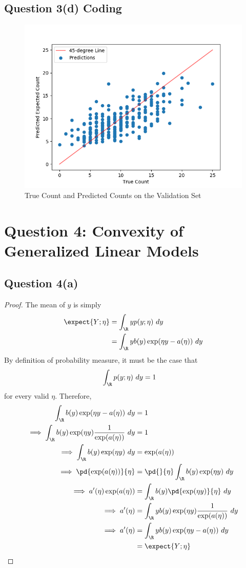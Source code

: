 \documentclass[11pt]{article}
\begin{document}
	\subsection{Question 3(d) Coding}
	\begin{figure}[h]
		\centering
		\includegraphics[width=0.6\linewidth]{src/poisson/poisson_pred.png}
		\caption{True Count and Predicted Counts on the Validation Set}
	\end{figure}
	
	\newpage
	\section{Question 4: Convexity of Generalized Linear Models}
	\subsection{Question 4(a)}
	\begin{proof}
		The mean of $y$ is simply
		\begin{align}
			\expect{Y;\eta} &= \int_\R y p(y; \eta)\ dy \\
			&= \int_\R y b(y) \exp(\eta y - a(\eta))\ dy
		\end{align}
		By definition of probability measure, it must be the case that 
		\begin{align}
			\int_\R p(y; \eta)\ dy &= 1
		\end{align}
		for every valid $\eta$. Therefore,
		\begin{align}
			\int_\R b(y) \exp(\eta y - a(\eta))\ dy &= 1 \\
			\implies \int_\R b(y) \exp(\eta y) \frac{1}{\exp(a(\eta))}\ dy &= 1 \\
			\implies \int_\R b(y) \exp(\eta y)\ dy &= \exp(a(\eta)) \\
			\implies \pd{\exp(a(\eta))}{\eta} &= \pd{}{\eta} \int_\R b(y) \exp(\eta y)\ dy \\
			\implies a'(\eta) \exp(a(\eta)) &= \int_\R b(y) \pd{\exp(\eta y)}{\eta}\ dy \\
			\implies a'(\eta) &= \int_\R y b(y) \exp(\eta y) \frac{1}{\exp(a(\eta))}\ dy \\
			\implies a'(\eta) &= \int_\R y b(y) \exp(\eta y - a(\eta))\ dy \\
			&= \expect{Y;\eta}
		\end{align}
	\end{proof}
	
\end{document}
